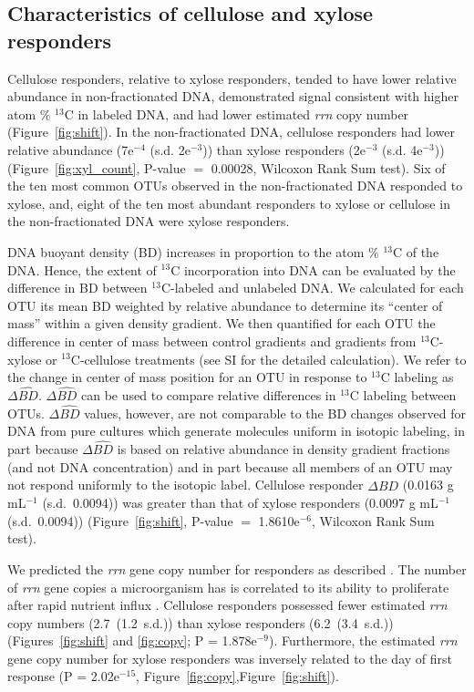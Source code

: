 \subsection{Characteristics of cellulose and xylose responders}
Cellulose responders, relative to xylose responders, tended to have lower
relative abundance in non-fractionated DNA, demonstrated signal consistent with
higher atom \% $^{13}$C in labeled DNA, and had lower estimated \textit{rrn}
copy number (Figure~\ref{fig:shift}). In the non-fractionated DNA, cellulose
responders had lower relative abundance (7e$^{-4}$ (s.d. 2e$^{-3}$)) than
xylose responders (2e$^{-3}$ (s.d. 4e$^{-3}$)) (Figure~\ref{fig:xyl_count},
P-value $=$ 0.00028, Wilcoxon Rank Sum test). Six of the ten most common OTUs
observed in the non-fractionated DNA responded to xylose, and, eight of the ten
most abundant responders to xylose or cellulose in the non-fractionated DNA
were xylose responders.

DNA buoyant density (BD) increases in proportion to the atom \% $^{13}$C of the
DNA. Hence, the extent of $^{13}$C incorporation into DNA can be evaluated 
by the difference in BD between $^{13}$C-labeled and unlabeled DNA. We
calculated for each OTU its mean BD weighted by relative abundance to determine
its ``center of mass'' within a given density gradient. We then quantified for
each OTU the difference in center of mass between control gradients and
gradients from $^{13}$C-xylose or $^{13}$C-cellulose treatments (see SI for the
detailed calculation). We refer to the change in center of mass position for an
OTU in response to $^{13}$C labeling as $\Delta\hat{BD}$. $\Delta\hat{BD}$ can
be used to compare relative differences in $^{13}$C labeling between OTUs.
$\Delta\hat{BD}$ values, however, are not comparable to the BD changes observed
for DNA from pure cultures which generate molecules uniform in isotopic
labeling, in part because $\Delta\hat{BD}$ is based on relative abundance in
density gradient fractions (and not DNA concentration) and in part because all
members of an OTU may not respond uniformly to the isotopic label. Cellulose
responder $\Delta\hat{BD}$ (0.0163 g mL$^{-1}$ (s.d.~0.0094)) was greater than
that of xylose responders (0.0097 g mL$^{-1}$ (s.d.~0.0094))
(Figure~\ref{fig:shift}, P-value $=$
1.8610e$^{-6}$, Wilcoxon Rank Sum test). 

We predicted the \textit{rrn} gene copy number for responders as described
\citep{Kembel_2012}. The number of \textit{rrn} gene copies a microorganism has
is correlated to its ability to proliferate after rapid 
nutrient influx \citep{Klappenbach_2000}. Cellulose responders possessed fewer
estimated \textit{rrn} copy numbers (2.7~(1.2~s.d.)) than xylose responders
(6.2~(3.4~s.d.)) (Figures~\ref{fig:shift} and \ref{fig:copy};
P = 1.878e$^{-9}$). Furthermore, the estimated \textit{rrn} gene copy number
for xylose responders was inversely related to the day of first response (P
= 2.02e$^{-15}$, Figure~\ref{fig:copy},Figure~\ref{fig:shift}).

